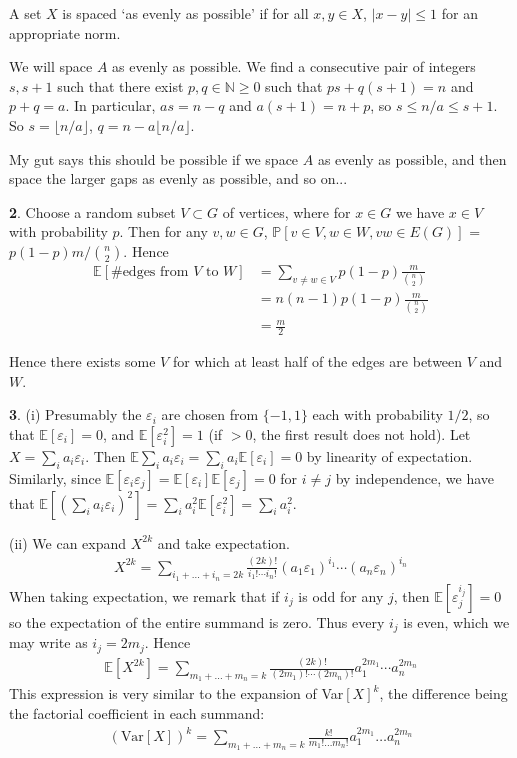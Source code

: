 \documentclass[]{article}
\theoremstyle{custhm}
\theoremstyle{cusdef}
\theoremstyle{custhm}
\theoremstyle{custhm}
\theoremstyle{custhm}
\theoremstyle{custhm}
\theoremstyle{cusdef}
\theoremstyle{remark}
\newcommand{\N}{\mathbb{N}}
\newcommand{\eps}{\varepsilon}
\newcommand{\E}{\mathbb{E}}
\renewcommand{\P}{\mathbb{P}}
\begin{document}
A set $X$ is spaced `as evenly as possible' if for all $x,y\in X$, $|x - y| \le 1$ for an appropriate norm.

We will space $A$ as evenly as possible. We find a consecutive pair of integers $s,s+1$ such that there exist $p,q\in \N\ge0$ such that $ps+q(s+1) = n$ and $p+q = a$. In particular, $as = n-q$ and $a(s+1) = n+p$, so $s\le n/a \le s+1$. So $s = \lfloor n/a \rfloor$, $q = n - a\lfloor n/a\rfloor$.

My gut says this should be possible if we space $A$ as evenly as possible, and then space the larger gaps as evenly as possible, and so on...

\textbf{2}. Choose a random subset $V\subset G$ of vertices, where for $x\in G$ we have $x\in V$ with probability $p$. Then for any $v,w\in G$, $\P[v\in V,w\in W, vw\in E(G)]$ = $p(1-p)m/\binom{n}{2}$. Hence
\begin{align*}
\E[\#\textrm{edges from }V\textrm{ to }W] &= \sum_{v\ne w\in V}p(1-p)\frac{m}{\binom{n}{2}}\\
&= n(n-1)p(1-p)\frac{m}{\binom{n}{2}}\\
&= \frac{m}{2}
\end{align*}

Hence there exists some $V$ for which at least half of the edges are between $V$ and $W$.

\textbf{3}. (i) Presumably the $\eps_i$ are chosen from $\{-1,1\}$ each with probability $1/2$, so that $\E[\eps_i] = 0$, and $\E[\eps_i^2] = 1$ (if $>0$, the first result does not hold). Let $X = \sum_i a_i\eps_i$. Then $\E\sum_i a_i\eps_i = \sum_ia_i\E[\eps_i] = 0$ by linearity of expectation. Similarly, since $\E[\eps_i\eps_j] = \E[\eps_i]\E[\eps_j] = 0$ for $i\ne j$ by independence, we have that $\E[(\sum_i a_i\eps_i)^2] = \sum_i a_i^2\E[\eps_i^2] = \sum_i a_i^2$.

(ii) We can expand $X^{2k}$ and take expectation.
\begin{align*}
X^{2k} = \sum_{i_1+\dots+i_n = 2k}\frac{(2k)!}{i_1!\cdots i_n!}(a_1\eps_1)^{i_1}\cdots (a_n\eps_n)^{i_n}
\end{align*}
When taking expectation, we remark that if $i_j$ is odd for any $j$, then $\E[\eps_j^{i_j}]=0$ so the expectation of the entire summand is zero. Thus every $i_j$ is even, which we may write as $i_j = 2m_j$. Hence
\begin{align*}
\E[X^{2k}] = \sum_{m_1+\dots+m_n = k} \frac{(2k)!}{(2m_1)!\cdots(2m_n)!}a_1^{2m_1}\cdots a_n^{2m_n}
\end{align*}
This expression is very similar to the expansion of Var$[X]^{k}$, the difference being the factorial coefficient in each summand:
\begin{align*}
(\textrm{Var}[X])^{k} = \sum_{m_1+\dots+m_n = k} \frac{k!}{m_1!\dots m_n!} a_1^{2m_1}\dots a_n^{2m_n}
\end{align*}
\end{document}
